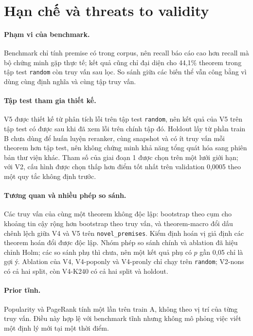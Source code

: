\documentclass[11pt,a4paper,oneside]{report}
\newcommand{\code}[1]{\texttt{#1}}
\begin{document}
\section{Hạn chế và threats to validity}

\paragraph{Phạm vi của benchmark.} Benchmark chỉ tính premise có trong corpus, nên recall báo cáo cao hơn recall mà bộ
chứng minh gặp thực tế; kết quả cũng chỉ đại diện cho 44,1\% theorem trong tập test \code{random} còn truy vấn sau lọc. So
sánh giữa các biến thể vẫn công bằng vì dùng cùng định nghĩa và cùng tập truy vấn.

\paragraph{Tập test tham gia thiết kế.} V5 được thiết kế từ phân tích lỗi trên tập test \code{random}, nên kết quả của V5
trên tập test có được sau khi đã xem lỗi trên chính tập đó. Holdout lấy từ phần train B chưa dùng để huấn luyện reranker,
cùng snapshot và có ít truy vấn mỗi theorem hơn tập test, nên không chứng minh khả năng tổng quát hóa sang phiên bản thư
viện khác. Tham số của giai đoạn 1 được chọn trên một lưới giới hạn; với V2, cấu hình được chọn thấp hơn điểm tốt nhất trên
validation 0,0005 theo một quy tắc không định trước.

\paragraph{Tương quan và nhiều phép so sánh.} Các truy vấn của cùng một theorem không độc lập: bootstrap theo cụm cho khoảng
tin cậy rộng hơn bootstrap theo truy vấn, và theorem-macro đổi dấu chênh lệch giữa V4 và V5 trên \code{novel\_premises}.
Kiểm định hoán vị giả định các theorem hoán đổi được độc lập. Nhóm phép so sánh chính và ablation đã hiệu chỉnh Holm; các
so sánh phụ thì chưa, nên một kết quả phụ có $p$ gần 0,05 chỉ là gợi ý. Ablation của V4, V4-poponly và V4-pronly chỉ chạy
trên \code{random}; V2-nons có cả hai split, còn V4-K240 có cả hai split và holdout.

\paragraph{Prior tĩnh.} Popularity và PageRank tính một lần trên train A, không theo vị trí của từng truy vấn. Điều này hợp
lệ với benchmark tĩnh nhưng không mô phỏng việc viết một định lý mới tại một thời điểm.
\end{document}
